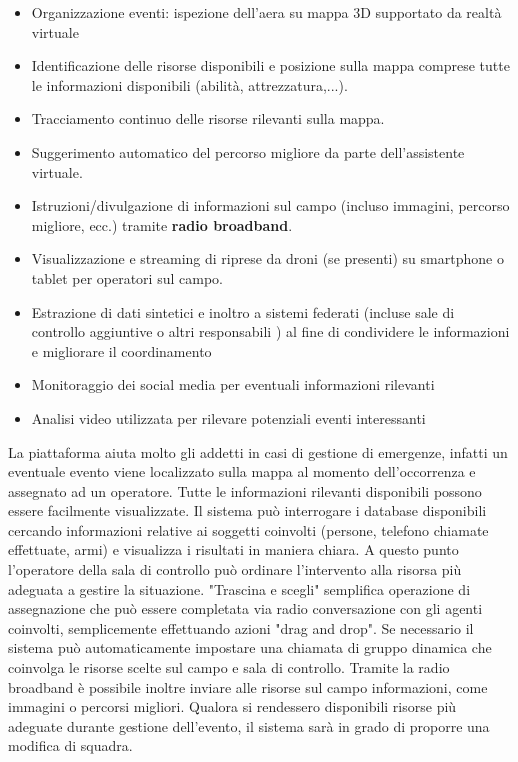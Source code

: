 \begin{itemize}
    \item Organizzazione eventi: ispezione dell'aera su mappa 3D
    supportato da realtà virtuale
    \item Identificazione delle risorse disponibili e posizione sulla mappa
    comprese tutte le informazioni disponibili (abilità, attrezzatura,...).
    \item Tracciamento continuo delle risorse rilevanti sulla mappa.
    \item Suggerimento automatico del percorso migliore da parte dell'assistente virtuale.
    \item Istruzioni/divulgazione di informazioni sul campo (incluso
    immagini, percorso migliore, ecc.) tramite \textbf{radio broadband}.
    \item Visualizzazione e streaming di riprese da droni (se presenti) su
    smartphone o tablet per operatori sul campo.
    \item Estrazione di dati sintetici e inoltro a sistemi federati
    (incluse sale di controllo aggiuntive o altri responsabili )
    al fine di condividere le informazioni e migliorare il coordinamento
    \item Monitoraggio dei social media per eventuali informazioni rilevanti
    \item Analisi video utilizzata per rilevare potenziali eventi interessanti
\end{itemize}


La piattaforma aiuta molto gli addetti in casi di gestione di emergenze, infatti un eventuale
evento viene localizzato sulla mappa al momento dell'occorrenza e assegnato ad un operatore.
Tutte le informazioni rilevanti disponibili possono essere facilmente visualizzate. 
Il sistema può interrogare i database disponibili cercando
informazioni relative ai soggetti coinvolti (persone, telefono
chiamate effettuate, armi) e visualizza i risultati in maniera chiara.
A questo punto l'operatore della sala di controllo può ordinare l'intervento alla 
risorsa  più adeguata a gestire la situazione. "Trascina e scegli" semplifica
operazione di assegnazione che può essere completata via radio
conversazione con gli agenti coinvolti, semplicemente effettuando azioni "drag and drop".
Se necessario il sistema può automaticamente impostare una chiamata di gruppo dinamica 
che coinvolga le risorse scelte sul campo e sala di controllo. Tramite la radio broadband è possibile
inoltre inviare alle risorse sul campo informazioni, come immagini o percorsi migliori.
Qualora si rendessero disponibili risorse più adeguate durante
gestione dell'evento, il sistema sarà in grado di proporre una modifica di squadra.


